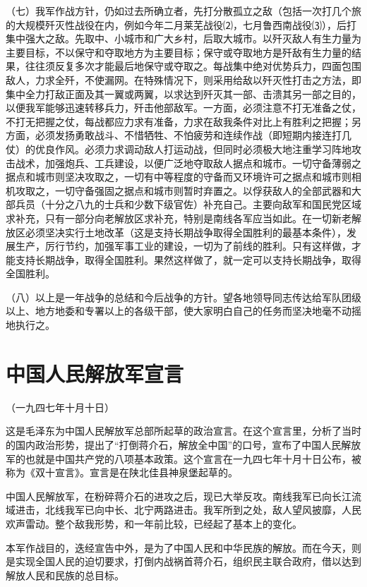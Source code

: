 \documentclass[UTF-8, a5paper, 12pt]{ctexart}
\begin{document}
（七）我军作战方针，仍如过去所确立者，先打分散孤立之敌（包括一次打几个旅的大规模歼灭性战役在内，例如今年二月莱芜战役⑵，七月鲁西南战役⑶），后打集中强大之敌。先取中、小城市和广大乡村，后取大城市。以歼灭敌人有生力量为主要目标，不以保守和夺取地方为主要目标；保守或夺取地方是歼敌有生力量的结果，往往须反复多次才能最后地保守或夺取之。每战集中绝对优势兵力，四面包围敌人，力求全歼，不使漏网。在特殊情况下，则采用给敌以歼灭性打击之方法，即集中全力打敌正面及其一翼或两翼，以求达到歼灭其一部、击溃其另一部之目的，以便我军能够迅速转移兵力，歼击他部敌军。一方面，必须注意不打无准备之仗，不打无把握之仗，每战都应力求有准备，力求在敌我条件对比上有胜利之把握；另方面，必须发扬勇敢战斗、不惜牺牲、不怕疲劳和连续作战（即短期内接连打几仗）的优良作风。必须力求调动敌人打运动战，但同时必须极大地注重学习阵地攻击战术，加强炮兵、工兵建设，以便广泛地夺取敌人据点和城市。一切守备薄弱之据点和城市则坚决攻取之，一切有中等程度的守备而又环境许可之据点和城市则相机攻取之，一切守备强固之据点和城市则暂时弃置之。以俘获敌人的全部武器和大部兵员（十分之八九的士兵和少数下级官佐）补充自己。主要向敌军和国民党区域求补充，只有一部分向老解放区求补充，特别是南线各军应当如此。在一切新老解放区必须坚决实行土地改革（这是支持长期战争取得全国胜利的最基本条件），发展生产，厉行节约，加强军事工业的建设，一切为了前线的胜利。只有这样做，才能支持长期战争，取得全国胜利。果然这样做了，就一定可以支持长期战争，取得全国胜利。

（八）以上是一年战争的总结和今后战争的方针。望各地领导同志传达给军队团级以上、地方地委和专署以上的各级干部，使大家明白自己的任务而坚决地毫不动摇地执行之。


\section{中国人民解放军宣言}


（一九四七年十月十日）

这是毛泽东为中国人民解放军总部所起草的政治宣言。在这个宣言里，分析了当时的国内政治形势，提出了“打倒蒋介石，解放全中国”的口号，宣布了中国人民解放军的也就是中国共产党的八项基本政策。这个宣言在一九四七年十月十日公布，被称为《双十宣言》。宣言是在陕北佳县神泉堡起草的。

中国人民解放军，在粉碎蒋介石的进攻之后，现已大举反攻。南线我军已向长江流域进击，北线我军已向中长、北宁两路进击。我军所到之处，敌人望风披靡，人民欢声雷动。整个敌我形势，和一年前比较，已经起了基本上的变化。

本军作战目的，迭经宣告中外，是为了中国人民和中华民族的解放。而在今天，则是实现全国人民的迫切要求，打倒内战祸首蒋介石，组织民主联合政府，借以达到解放人民和民族的总目标。
\end{document}
